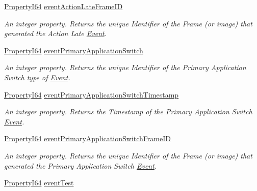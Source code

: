 \begin{DoxyCompactItemize}
\hyperlink{group___common_interface_ga81749b2696755513663492664a18a893}{Property\+I64} \hyperlink{classmv_i_m_p_a_c_t_1_1acquire_1_1_gen_i_cam_1_1_event_control_afb1ffcd41f45ee86d5438b9c507cb229}{event\+Action\+Late\+Frame\+I\+D}
\begin{DoxyCompactList}\small\item\em An integer property. Returns the unique Identifier of the Frame (or image) that generated the Action Late \hyperlink{classmv_i_m_p_a_c_t_1_1acquire_1_1_event}{Event}. \end{DoxyCompactList}\item 
\hyperlink{group___common_interface_ga81749b2696755513663492664a18a893}{Property\+I64} \hyperlink{classmv_i_m_p_a_c_t_1_1acquire_1_1_gen_i_cam_1_1_event_control_a6aa61c60c5f9a05f9156939cc938f40b}{event\+Primary\+Application\+Switch}
\begin{DoxyCompactList}\small\item\em An integer property. Returns the unique Identifier of the Primary Application Switch type of \hyperlink{classmv_i_m_p_a_c_t_1_1acquire_1_1_event}{Event}. \end{DoxyCompactList}\item 
\hyperlink{group___common_interface_ga81749b2696755513663492664a18a893}{Property\+I64} \hyperlink{classmv_i_m_p_a_c_t_1_1acquire_1_1_gen_i_cam_1_1_event_control_adb2477f8d9fc19acab3c3af89f7936de}{event\+Primary\+Application\+Switch\+Timestamp}
\begin{DoxyCompactList}\small\item\em An integer property. Returns the Timestamp of the Primary Application Switch \hyperlink{classmv_i_m_p_a_c_t_1_1acquire_1_1_event}{Event}. \end{DoxyCompactList}\item 
\hyperlink{group___common_interface_ga81749b2696755513663492664a18a893}{Property\+I64} \hyperlink{classmv_i_m_p_a_c_t_1_1acquire_1_1_gen_i_cam_1_1_event_control_ab415e09e47659526aa05a3f41e80bf1d}{event\+Primary\+Application\+Switch\+Frame\+I\+D}
\begin{DoxyCompactList}\small\item\em An integer property. Returns the unique Identifier of the Frame (or image) that generated the Primary Application Switch \hyperlink{classmv_i_m_p_a_c_t_1_1acquire_1_1_event}{Event}. \end{DoxyCompactList}\item 
\hyperlink{group___common_interface_ga81749b2696755513663492664a18a893}{Property\+I64} \hyperlink{classmv_i_m_p_a_c_t_1_1acquire_1_1_gen_i_cam_1_1_event_control_a223096bfa8b587f5da10b1a18fed4f7e}{event\+Test}

\end{DoxyCompactItemize}
